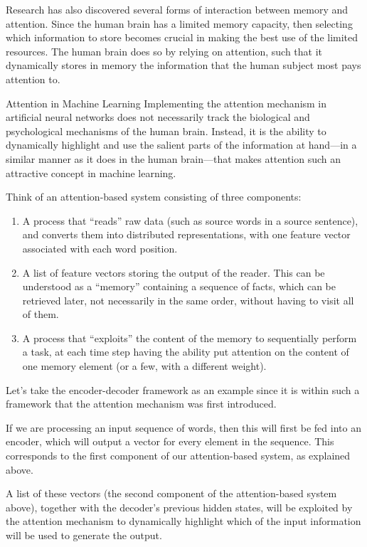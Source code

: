 \documentclass[10pt,a4paper]{article}
\begin{document}
Research has also discovered several forms of interaction between memory and attention. Since the human brain has a limited memory capacity, then selecting which information to store becomes crucial in making the best use of the limited resources. The human brain does so by relying on attention, such that it dynamically stores in memory the information that the human subject most pays attention to. 


Attention in Machine Learning
Implementing the attention mechanism in artificial neural networks does not necessarily track the biological and psychological mechanisms of the human brain. Instead, it is the ability to dynamically highlight and use the salient parts of the information at hand—in a similar manner as it does in the human brain—that makes attention such an attractive concept in machine learning.

Think of an attention-based system consisting of three components:

\begin{enumerate}
	\item A process that “reads” raw data (such as source words in a source sentence), and converts them into distributed representations, with one feature vector associated with each word position. 
	
	\item A list of feature vectors storing the output of the reader. This can be understood as a “memory” containing a sequence of facts, which can be retrieved later, not necessarily in the same order, without having to visit all of them.
	
	\item A process that “exploits” the content of the memory to sequentially perform a task, at each time step having the ability put attention on the content of one memory element (or a few, with a different weight).
	
\end{enumerate}

Let’s take the encoder-decoder framework as an example since it is within such a framework that the attention mechanism was first introduced. 

If we are processing an input sequence of words, then this will first be fed into an encoder, which will output a vector for every element in the sequence. This corresponds to the first component of our attention-based system, as explained above. 

A list of these vectors (the second component of the attention-based system above), together with the decoder’s previous hidden states, will be exploited by the attention mechanism to dynamically highlight which of the input information will be used to generate the output. 
\end{document}
